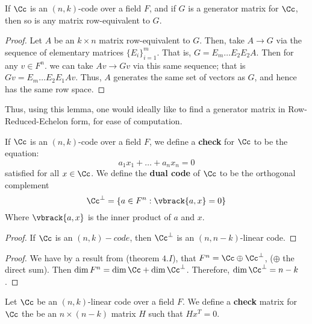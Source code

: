\begin{lemma}\label{1.1.1}
    If $\Cc$ is an  $(n,k)$-code over a field $F$, and if  $G$ is a generator
    matrix for  $\Cc$, then so is any matrix row-equivalent to  $G$.
\end{lemma}
\begin{proof}
    Let $A$ be an  $k \times n$ matrix row-equivalent to $G$. Then, take  $A
    \rightarrow G$ via the sequence of elementary matrices $\{E_i\}_{i=1}^m$.
    That is, $G=E_m \dots E_2E_2A$. Then for any $v \in F^n$. we can take $Av
    \rightarrow Gv$ via this same sequence; that is  $Gv=E_m \dots E_2E_1Av$.
    Thus, $A$ generates the same set of vectors as  $G$, and hence has the same
    row space.
\end{proof}
\begin{remark}
    Thus, using this lemma, one would ideally like to find a generator matrix in
    Row-Reduced-Echelon form, for ease of computation.
\end{remark}

\begin{definition}
    If $\Cc$ is an  $(n,k)$-code over a field $F$, we define a  \textbf{check}
    for $\Cc$ to be the equation:
    \begin{equation}
        a_1x_1+\dots+a_nx_n=0
    \end{equation}
    satisfied for all $x \in \Cc$. We define the \textbf{dual code} of $\Cc$ to
    be the orthogonal complement
    \begin{equation}
        \Cc^{\perp}=\{a \in F^n : \vbrack{a,x}=0\}
    \end{equation}
    Where $\vbrack{a,x}$ is the inner product of $a$ and  $x$.
\end{definition}

\begin{proof}
    If $\Cc$ is an  $(n,k)-code$, then $\Cc^\perp$ is an  $(n,n-k)$-linear code.
\end{proof}
\begin{proof}
    We have by a result from \cite{herstein} (theorem $4.I$), that $F^n=\Cc
    \oplus \Cc^\perp$, ($\oplus$ the direct sum). Then
    $\dim{F^n}=\dim{\Cc}+\dim{\Cc^\perp}$. Therefore, $\dim{\Cc^\perp}=n-k$.
\end{proof}

\begin{definition}
    Let $\Cc$ be an $(n,k)$-linear code over a field $F$. We define a
    \textbf{check} matrix for $\Cc$ the be an $n \times (n-k)$ matrix $H$ such
    that  $Hx^T=0$.
\end{definition}

